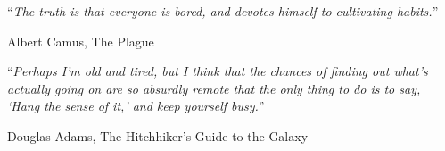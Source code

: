 \documentclass[
11pt, %
english, %
singlespacing, %
headsepline, %
]{MastersDoctoralThesis} %
\newcommand{\inlinetodo}[1]{\todo[inline,size=\normalsize]{#1}}
\begin{document}


\vspace*{0.2\textheight}

\noindent\enquote{\itshape The truth is that everyone is bored, and devotes himself to
cultivating habits.}\bigbreak

\hfill Albert Camus, The Plague

\vspace{2cm}

\noindent\enquote{\itshape Perhaps I'm old and tired, but I think that the chances of
finding out what's actually going on are so absurdly remote that the only thing to do
is to say, \enquote{Hang the sense of it,} and keep yourself busy.}\bigbreak

\hfill Douglas Adams, The Hitchhiker's Guide to the Galaxy










\tableofcontents %
\end{document}
